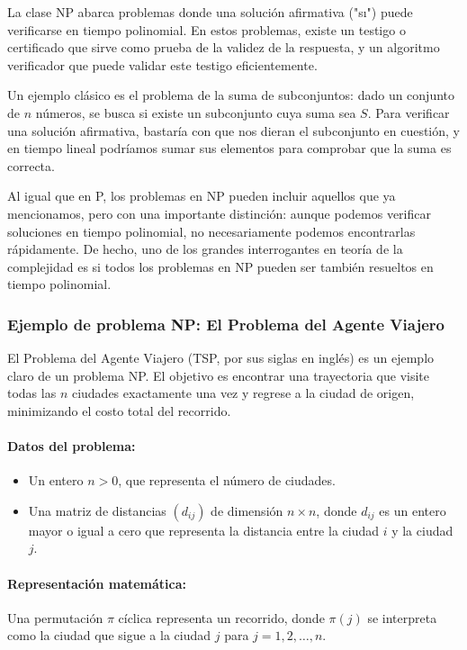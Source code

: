 \documentclass[12pt,titlepage,twoside,openright]{book}
\begin{document}
La clase NP abarca problemas donde una soluci\'on afirmativa ("s\i") puede verificarse en tiempo polinomial. En estos problemas, existe un testigo o certificado que sirve como prueba de la validez de la respuesta, y un algoritmo verificador que puede validar este testigo eficientemente.

Un ejemplo cl\'asico es el problema de la suma de subconjuntos: dado un conjunto de $n$ n\'umeros, se busca si existe un subconjunto cuya suma sea $S$. Para verificar una soluci\'on afirmativa, bastar\'ia con que nos dieran el subconjunto en cuesti\'on, y en tiempo lineal podr\'iamos sumar sus elementos para comprobar que la suma es correcta.

Al igual que en P, los problemas en NP pueden incluir aquellos que ya mencionamos, pero con una importante distinci\'on: aunque podemos verificar soluciones en tiempo polinomial, no necesariamente podemos encontrarlas r\'apidamente. De hecho, uno de los grandes interrogantes en teor\'ia de la complejidad es si todos los problemas en NP pueden ser tambi\'en resueltos en tiempo polinomial.

\subsubsection{Ejemplo de problema NP: El Problema del Agente Viajero}

El Problema del Agente Viajero (TSP, por sus siglas en ingl\'es) es un ejemplo claro de un problema NP. El objetivo es encontrar una trayectoria que visite todas las $n$ ciudades exactamente una vez y regrese a la ciudad de origen, minimizando el costo total del recorrido.

\paragraph{Datos del problema:}
\begin{itemize}
	\item Un entero $n > 0$, que representa el n\'umero de ciudades.
	\item Una matriz de distancias $(d_{ij})$ de dimensi\'on $n \times n$, donde $d_{ij}$ es un entero mayor o igual a cero que representa la distancia entre la ciudad $i$ y la ciudad $j$.
\end{itemize}

\paragraph{Representaci\'on matem\'atica:}
Una permutaci\'on $\pi$ c\'iclica representa un recorrido, donde $\pi(j)$ se interpreta como la ciudad que sigue a la ciudad $j$ para $j = 1, 2, \dots, n$.
\end{document}
